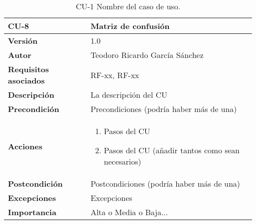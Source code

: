 \begin{table}[p]
	\centering
	\begin{tabularx}{\linewidth}{ p{} p{} }
		\toprule
		\textbf{CU-8}    & \textbf{Matriz de confusión}\\
		\toprule
		\textbf{Versión}              & 1.0    \\
		\textbf{Autor}                & Teodoro Ricardo García Sánchez \\
		\textbf{Requisitos asociados} & RF-xx, RF-xx \\
		\textbf{Descripción}          & La descripción del CU \\
		\textbf{Precondición}         & Precondiciones (podría haber más de una) \\
		\textbf{Acciones}             &
		\begin{enumerate}
			\def\labelenumi{\arabic{enumi}.}
			\tightlist
			\item Pasos del CU
			\item Pasos del CU (añadir tantos como sean necesarios)
		\end{enumerate}\\
		\textbf{Postcondición}        & Postcondiciones (podría haber más de una) \\
		\textbf{Excepciones}          & Excepciones \\
		\textbf{Importancia}          & Alta o Media o Baja... \\
		\bottomrule
	\end{tabularx}
	\caption{CU-1 Nombre del caso de uso.}
\end{table}

